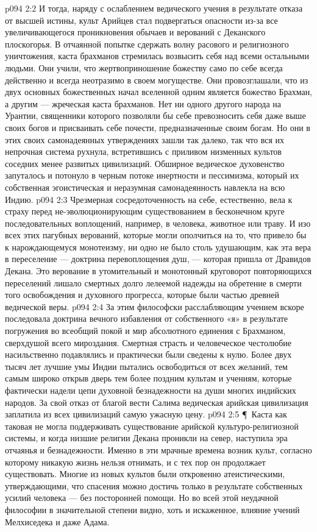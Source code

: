 \vs p094 2:2 И тогда, наряду с ослаблением ведического учения в результате отказа от высшей истины, культ Арийцев стал подвергаться опасности из\hyp{}за все увеличивающегося проникновения обычаев и верований с Деканского плоскогорья. В отчаянной попытке сдержать волну расового и религиозного уничтожения, каста брахманов стремилась возвысить себя над всеми остальными людьми. Они учили, что жертвоприношение божеству само по себе всегда действенно и всегда неотразимо в своем могуществе. Они провозглашали, что из двух основных божественных начал вселенной одним является божество Брахман, а другим --- жреческая каста брахманов. Нет ни одного другого народа на Урантии, священники которого позволяли бы себе превозносить себя даже выше своих богов и присваивать себе почести, предназначенные своим богам. Но они в этих своих самонадеянных утверждениях зашли так далеко, так что вся их непрочная система рухнула, встретившись с приливом низменных культов соседних менее развитых цивилизаций. Обширное ведическое духовенство запуталось и потонуло в черным потоке инертности и пессимизма, который их собственная эгоистическая и неразумная самонадеянность навлекла на всю Индию.
\vs p094 2:3 Чрезмерная сосредоточенность на себе, естественно, вела к страху перед не\hyp{}эволюционирующим существованием в бесконечном круге последовательных воплощений, например, в человека, животное или траву. И изо всех этих пагубных верований, которые могли ополчиться на то, что привело бы к нарождающемуся монотеизму, ни одно не было столь удушающим, как эта вера в переселение --- доктрина перевоплощения душ, --- которая пришла от Дравидов Декана. Это верование в утомительный и монотонный круговорот повторяющихся переселений лишало смертных долго лелеемой надежды на обретение в смерти того освобождения и духовного прогресса, которые были частью древней ведической веры.
\vs p094 2:4 За этим философски расслабляющим учением вскоре последовала доктрина вечного избавления от собственного «я» в результате погружения во всеобщий покой и мир абсолютного единения с Брахманом, сверхдушой всего мироздания. Смертная страсть и человеческое честолюбие насильственно подавлялись и практически были сведены к нулю. Более двух тысяч лет лучшие умы Индии пытались освободиться от всех желаний, тем самым широко открыв дверь тем более поздним культам и учениям, которые фактически надели цепи духовной безнадежности на души многих индийских народов. За свой отказ от благой вести Салима ведическая арийская цивилизация заплатила из всех цивилизаций самую ужасную цену.
\vs p094 2:5 \P\ Каста как таковая не могла поддерживать существование арийской культуро\hyp{}религиозной системы, и когда низшие религии Декана проникли на север, наступила эра отчаянья и безнадежности. Именно в эти мрачные времена возник культ, согласно которому никакую жизнь нельзя отнимать, и с тех пор он продолжает существовать. Многие из новых культов были откровенно атеистическими, утверждающими, что спасения можно достичь только в результате собственных усилий человека --- без посторонней помощи. Но во всей этой неудачной философии в значительной степени видно, хоть и искаженное, влияние учений Мелхиседека и даже Адама.
